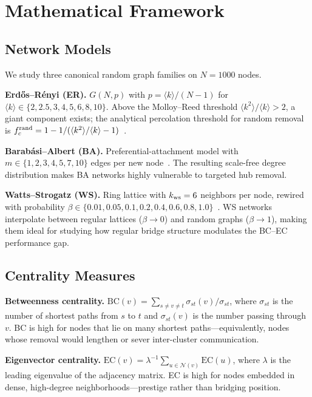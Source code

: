 \documentclass[journal]{IEEEtran}
\begin{document}
\section{Mathematical Framework}

\subsection{Network Models}

We study three canonical random graph families on $N = 1000$ nodes.

\textbf{Erd\H{o}s--R\'enyi (ER).}
$G(N, p)$ with $p = \langle k \rangle / (N-1)$ for
$\langle k \rangle \in \{2, 2.5, 3, 4, 5, 6, 8, 10\}$.
Above the Molloy--Reed threshold $\langle k^2 \rangle / \langle k \rangle > 2$,
a giant component exists; the analytical percolation threshold for random removal
is $f_c^{\rm rand} = 1 - 1/(\langle k^2 \rangle/\langle k \rangle - 1)$~\cite{molloy1995critical}.

\textbf{Barab\'asi--Albert (BA).}
Preferential-attachment model with $m \in \{1, 2, 3, 4, 5, 7, 10\}$
edges per new node~\cite{barabasi1999emergence}.
The resulting scale-free degree distribution makes BA networks highly
vulnerable to targeted hub removal.

\textbf{Watts--Strogatz (WS).}
Ring lattice with $k_{\rm ws} = 6$ neighbors per node, rewired with
probability $\beta \in \{0.01, 0.05, 0.1, 0.2, 0.4, 0.6, 0.8, 1.0\}$~\cite{watts1998collective}.
WS networks interpolate between regular lattices ($\beta \to 0$) and random
graphs ($\beta \to 1$), making them ideal for studying how regular bridge
structure modulates the BC--EC performance gap.

\subsection{Centrality Measures}

\textbf{Betweenness centrality.}
$\mathrm{BC}(v) = \sum_{s \neq v \neq t} \sigma_{st}(v) / \sigma_{st}$,
where $\sigma_{st}$ is the number of shortest paths from $s$ to $t$
and $\sigma_{st}(v)$ is the number passing through $v$.
BC is high for nodes that lie on many shortest paths---equivalently, nodes
whose removal would lengthen or sever inter-cluster communication.

\textbf{Eigenvector centrality.}
$\mathrm{EC}(v) = \lambda^{-1} \sum_{u \in \mathcal{N}(v)} \mathrm{EC}(u)$,
where $\lambda$ is the leading eigenvalue of the adjacency matrix.
EC is high for nodes embedded in dense, high-degree neighborhoods---prestige
rather than bridging position.
\end{document}
